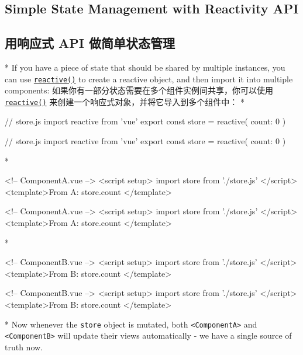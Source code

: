 \begin{paracol}{2}
\subsection{Simple State Management with Reactivity API}
\switchcolumn
\subsection{用响应式 API 做简单状态管理}
\switchcolumn[0]*%
If you have a piece of state that should be shared by multiple
instances, you can use
\href{https://vuejs.org/api/reactivity-core.html\#reactive}{\texttt{reactive()}}
to create a reactive object, and then import it into multiple
components:
\switchcolumn
如果你有一部分状态需要在多个组件实例间共享，你可以使用
\href{https://cn.vuejs.org/api/reactivity-core.html\#reactive}{\texttt{reactive()}}
来创建一个响应式对象，并将它导入到多个组件中：
\switchcolumn[0]*%
\begin{codeJs}
// store.js
import { reactive } from 'vue'
export const store = reactive({
  count: 0
})
\end{codeJs}
\switchcolumn
\begin{codeJs}
// store.js
import { reactive } from 'vue'
export const store = reactive({
  count: 0
})
\end{codeJs}
\switchcolumn[0]*%
\begin{codeHtml}
<!-- ComponentA.vue -->
<script setup>
import { store } from './store.js'
</script>
<template>From A: {{ store.count }}</template>
\end{codeHtml}
\switchcolumn
\begin{codeHtml}
<!-- ComponentA.vue -->
<script setup>
import { store } from './store.js'
</script>
<template>From A: {{ store.count }}</template>
\end{codeHtml}
\switchcolumn[0]*%
\begin{codeHtml}
<!-- ComponentB.vue -->
<script setup>
import { store } from './store.js'
</script>
<template>From B: {{ store.count }}</template>
\end{codeHtml}
\switchcolumn
\begin{codeHtml}
<!-- ComponentB.vue -->
<script setup>
import { store } from './store.js'
</script>
<template>From B: {{ store.count }}</template>
\end{codeHtml}
\switchcolumn[0]*%
Now whenever the \texttt{store} object is mutated, both
\texttt{\textless{}ComponentA\textgreater{}} and
\texttt{\textless{}ComponentB\textgreater{}} will update their views
automatically - we have a single source of truth now.

\end{paracol}
